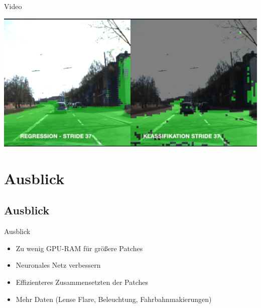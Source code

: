 \begin{frame}{Video}

      \begin{center}
    \includegraphics[scale=0.22]{../images/Convolutional/video_screenshot.png}
        \end{center}

\end{frame}

\section{Ausblick}
\subsection{Ausblick}
\begin{frame}{Ausblick}
    \begin{itemize}
        \item Zu wenig GPU-RAM f\"ur gr\"o\ss ere Patches
        \item Neuronales Netz verbessern
        \item Effizienteres Zusammensetzten der Patches
        \item Mehr Daten (Lense Flare, Beleuchtung, Fahrbahnmakierungen)
    \end{itemize}

\end{frame}